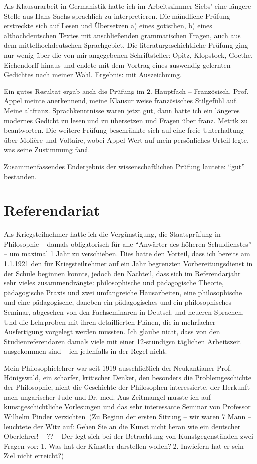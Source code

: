 \documentclass[a5paper,pagesize,10pt,twoside=true]{scrbook}
\begin{document}
Als Klausurarbeit in Germanistik hatte ich im Arbeitszimmer Siebs' eine längere Stelle aus Hans Sachs sprachlich zu interpretieren. Die mündliche Prüfung erstreckte sich auf Lesen und Übersetzen a) eines gotischen, b) eines althochdeutschen Textes mit anschließenden grammatischen Fragen, auch aus dem mittelhochdeutschen Sprachgebiet. Die literaturgeschichtliche Prüfung ging nur wenig über die von mir angegebenen Schriftsteller: Opitz, Klopstock, Goethe, Eichendorff hinaus und endete mit dem Vortrag eines auswendig gelernten Gedichtes nach meiner Wahl. Ergebnis: mit Auszeichnung.

Ein gutes Resultat ergab auch die Prüfung im 2. Hauptfach -- Französisch. Prof. Appel meinte anerkennend, meine Klausur weise französisches Stilgefühl auf. Meine altfranz. Sprachkenntnisse waren jetzt gut, dann hatte ich ein längeres modernes Gedicht zu lesen und zu übersetzen und Fragen über franz. Metrik zu beantworten. Die weitere Prüfung beschränkte sich auf eine freie Unterhaltung über Molière und Voltaire, wobei Appel Wert auf mein persönliches Urteil legte, was seine Zustimmung fand.

Zusammenfassendes Endergebnis der wissenschaftlichen Prüfung lautete: \enquote{gut} bestanden.

\section{Referendariat}
Als Kriegsteilnehmer hatte ich die Vergünstigung, die Staatsprüfung in Philosophie -- damals obligatorisch für alle \enquote{Anwärter des höheren Schuldienstes} -- um maximal 1 Jahr zu verschieben. Dies hatte den Vorteil, dass ich bereits am 1.1.1921 den für Kriegsteilnehmer auf ein Jahr begrenzten Vorbereitungsdienst in der Schule beginnen konnte, jedoch den Nachteil, dass sich im Referendarjahr sehr vieles zusammendrängte: philosophische und pädagogische Theorie, pädagogische Praxis und zwei umfangreiche Hausarbeiten, eine philosophische und eine pädagogische, daneben ein pädagogisches und ein philosophisches Seminar, abgesehen von den Fachseminaren in Deutsch und neueren Sprachen. Und die Lehrproben mit ihren detaillierten Plänen, die in mehrfacher Ausfertigung vorgelegt werden mussten. Ich glaube nicht, dass von den Studienreferendaren damals viele mit einer 12-stündigen täglichen Arbeitszeit ausgekommen sind -- ich jedenfalls in der Regel nicht.

Mein Philosophielehrer war seit 1919 ausschließlich der Neukantianer Prof. Hönigswald, ein scharfer, kritischer Denker, den besonders die Problemgeschichte der Philosophie, nicht die Geschichte der Philosophen interessierte, der Herkunft nach ungarischer Jude und Dr. med. Aus Zeitmangel musste ich auf kunstgeschichtliche Vorlesungen und das sehr interessante Seminar von Professor Wilhelm Pinder verzichten. (Zu Beginn der ersten Sitzung -- wir waren 7 Mann -- leuchtete der Witz auf: Gehen Sie an die Kunst nicht heran wie ein deutscher Oberlehrer! -- ?? -- Der legt sich bei der Betrachtung von Kunstgegenständen zwei Fragen vor: 1. Was hat der Künstler darstellen wollen? 2. Inwiefern hat er sein Ziel nicht erreicht?)
\end{document}
